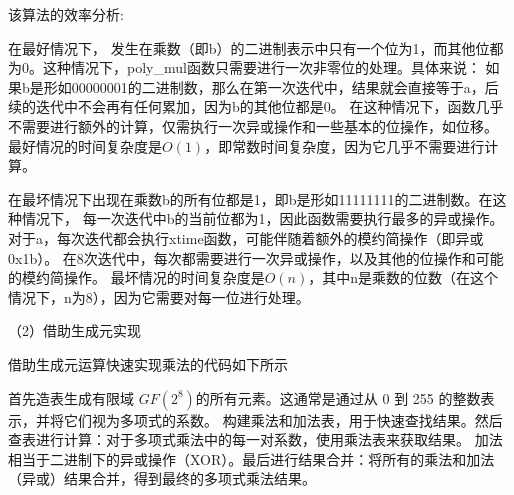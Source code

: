 \documentclass[a4paper,11pt,UTF8]{ctexart}
\begin{document}
                该算法的效率分析:\par
                在最好情况下，
                发生在乘数（即b）的二进制表示中只有一个位为1，而其他位都为0。这种情况下，poly\_mul函数只需要进行一次非零位的处理。具体来说：
                如果b是形如00000001的二进制数，那么在第一次迭代中，结果就会直接等于a，后续的迭代中不会再有任何累加，因为b的其他位都是0。
                在这种情况下，函数几乎不需要进行额外的计算，仅需执行一次异或操作和一些基本的位操作，如位移。
                最好情况的时间复杂度是$O(1)$，即常数时间复杂度，因为它几乎不需要进行计算。\par

                在最坏情况下出现在乘数b的所有位都是1，即b是形如11111111的二进制数。在这种情况下，
                每一次迭代中b的当前位都为1，因此函数需要执行最多的异或操作。
                对于a，每次迭代都会执行xtime函数，可能伴随着额外的模约简操作（即异或0x1b）。
                在8次迭代中，每次都需要进行一次异或操作，以及其他的位操作和可能的模约简操作。
                最坏情况的时间复杂度是$O(n)$，其中n是乘数的位数（在这个情况下，n为8），因为它需要对每一位进行处理。\par

            （2）借助生成元实现\par
                借助生成元运算快速实现乘法的代码如下所示
                
                首先造表生成有限域 $GF(2^8)$的所有元素。这通常是通过从 0 到 255 的整数表示，并将它们视为多项式的系数。
                构建乘法和加法表，用于快速查找结果。然后查表进行计算：对于多项式乘法中的每一对系数，使用乘法表来获取结果。
                加法相当于二进制下的异或操作（XOR）。最后进行结果合并：将所有的乘法和加法（异或）结果合并，得到最终的多项式乘法结果。
\end{document}
